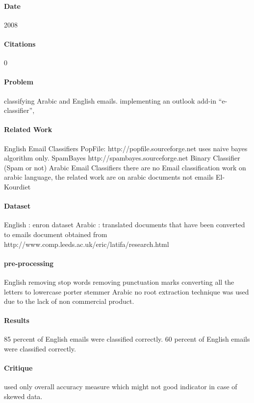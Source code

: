 \documentclass[12pt]{article}
\begin{document}
\paragraph{Date} 2008
\paragraph{Citations} 0

\paragraph{Problem}
classifying Arabic and English emails.
implementing an outlook add-in “e-classifier”,

\paragraph{Related Work}
English Email Classifiers
PopFile:
http://popfile.sourceforge.net
uses naive bayes algorithm only.
SpamBayes
http://spambayes.sourceforge.net
Binary Classifier (Spam or not)
Arabic Email Classifiers
there are no Email classification work on arabic language, the related work are on arabic documents not emails
El-Kourdiet

\paragraph{Dataset}
English : enron dataset
Arabic :
translated documents that have been converted to emails
document obtained from
http://www.comp.leeds.ac.uk/eric/latifa/research.html

\paragraph{pre-processing}
English
removing stop words
removing punctuation marks
converting all the letters to lowercase
porter stemmer
Arabic
no root extraction technique was used due to the lack of non commercial product.

\paragraph{Results}
85 percent of English emails were classified correctly.
60 percent of English emails were classified correctly.

\paragraph{Critique}
used only overall accuracy measure which might not good indicator in case of skewed data.
\end{document}
